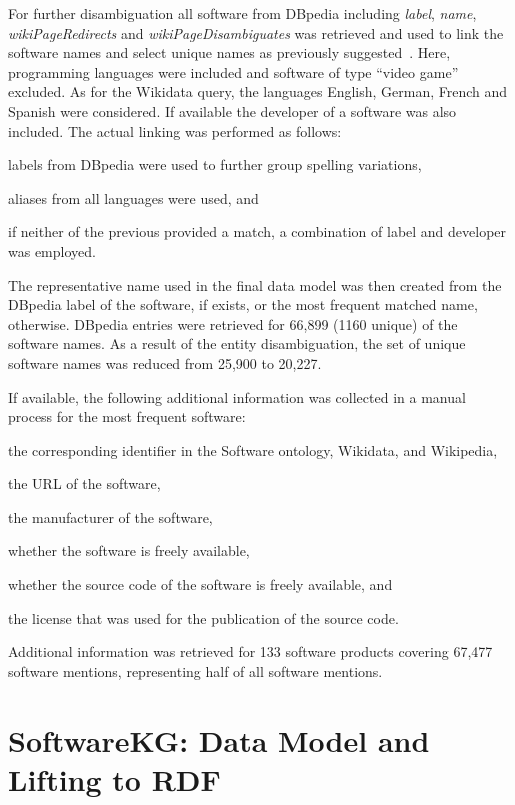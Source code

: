 \documentclass[runningheads]{llncs}
\begin{document}
For further disambiguation all software from DBpedia including \textit{label}, \textit{name}, \textit{wikiPageRedirects} and \textit{wikiPageDisambiguates} was retrieved and used to link the software names and select unique names as previously suggested~\cite{weichselbraun2019name}. 
Here, programming languages were included and software of type ``video game'' excluded.
As for the Wikidata query, the languages English, German, French and Spanish were considered.
If available the developer of a software was also included.
The actual linking was performed as follows:
\begin{compactenum}[1.)]
    \item labels from DBpedia were used to further group spelling variations,
    \item aliases from all languages were used, and
    \item if neither of the previous provided a match, a combination of label and developer was employed.
\end{compactenum} 
The representative name used in the final data model was then created from the DBpedia label of the software, if exists, or the most frequent matched name, otherwise.
DBpedia entries were retrieved for 66,899 (1160 unique) of the software names.
As a result of the entity disambiguation, the set of unique software names was reduced from 25,900 to 20,227.

If available, the following additional information was collected in a manual process for the most frequent software:
\begin{inparaenum}[1.)]
    \item the corresponding identifier in the Software ontology, Wikidata, and Wikipedia,
    \item the URL of the software,
    \item the manufacturer of the software,
    \item whether the software is freely available,
    \item whether the source code of the software is freely available, and
    \item the license that was used for the publication of the source code.
\end{inparaenum}
Additional information was retrieved for 133 software products covering 67,477 software mentions, representing half of all software mentions.

\section{SoftwareKG: Data Model and Lifting to RDF}
\end{document}
